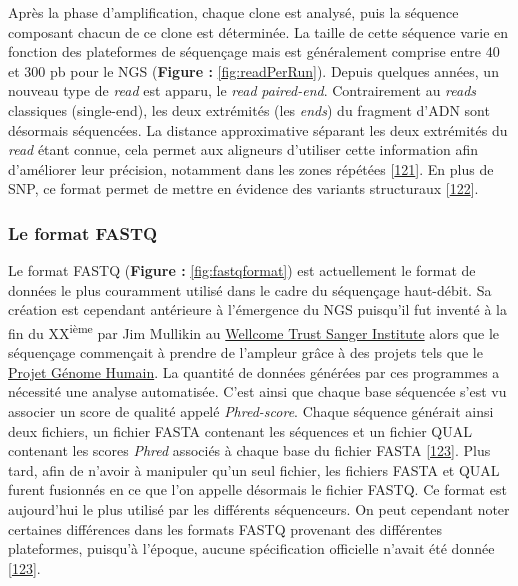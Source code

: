 \documentclass[12pt,twoside]{ugathesis}
\theoremstyle{definition}
\theoremstyle{definition}
\theoremstyle{remark}
\begin{document}
Après la phase d'amplification, chaque clone est analysé, puis la
séquence composant chacun de ce clone est déterminée. La taille de cette
séquence varie en fonction des plateformes de séquençage mais est
généralement comprise entre 40 et 300 pb pour le NGS (\textbf{Figure :
}\ref{fig:readPerRun}). Depuis quelques années, un nouveau type de
\emph{read} est apparu, le \emph{read} \emph{paired-end}. Contrairement
au \emph{reads} classiques (single-end), les deux extrémités (les
\emph{ends}) du fragment d'ADN sont désormais séquencées. La distance
approximative séparant les deux extrémités du \emph{read} étant connue,
cela permet aux aligneurs d'utiliser cette information afin d'améliorer
leur précision, notamment dans les zones répétées
{[}\protect\hyperlink{ref-Li2008}{121}{]}. En plus de SNP, ce format
permet de mettre en évidence des variants structuraux
{[}\protect\hyperlink{ref-Korbel2009}{122}{]}.

\newpage

\subsubsection{Le format FASTQ}\label{fastq}

Le format FASTQ (\textbf{Figure : }\ref{fig:fastqformat}) est
actuellement le format de données le plus couramment utilisé dans le
cadre du séquençage haut-débit. Sa création est cependant antérieure à
l'émergence du NGS puisqu'il fut inventé à la fin du
XX\textsuperscript{ième} par Jim Mullikin au
\href{https://fr.wikipedia.org/wiki/Wellcome_Trust_Sanger_Institute}{Wellcome
Trust Sanger Institute} alors que le séquençage commençait à prendre de
l'ampleur grâce à des projets tels que le
\href{https://fr.wikipedia.org/wiki/Projet_G\%C3\%A9nome_Humain}{Projet
Génome Humain}. La quantité de données générées par ces programmes a
nécessité une analyse automatisée. C'est ainsi que chaque base séquencée
s'est vu associer un score de qualité appelé \emph{Phred-score}. Chaque
séquence générait ainsi deux fichiers, un fichier FASTA contenant les
séquences et un fichier QUAL contenant les scores \emph{Phred} associés
à chaque base du fichier FASTA
{[}\protect\hyperlink{ref-Cock2009}{123}{]}. Plus tard, afin de n'avoir
à manipuler qu'un seul fichier, les fichiers FASTA et QUAL furent
fusionnés en ce que l'on appelle désormais le fichier FASTQ. Ce format
est aujourd'hui le plus utilisé par les différents séquenceurs. On peut
cependant noter certaines différences dans les formats FASTQ provenant
des différentes plateformes, puisqu'à l'époque, aucune spécification
officielle n'avait été donnée
{[}\protect\hyperlink{ref-Cock2009}{123}{]}.
\end{document}
